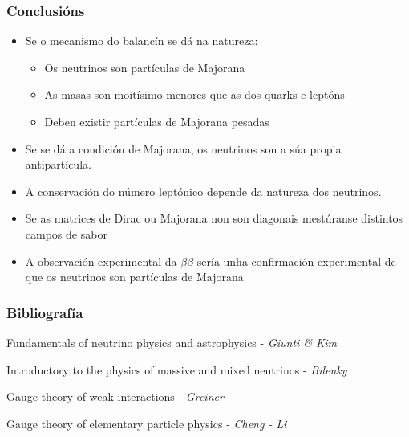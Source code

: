 \documentclass[10pt]{beamer}
\newcommand{\bi}{\begin{itemize}}
\newcommand{\ei}{\end{itemize}}
\begin{document}
\begin{frame} \frametitle{Conclusións}
\bi

\item Se o mecanismo do balancín se dá na natureza:

\bi

\item Os neutrinos son partículas de Majorana

\item As masas son moitísimo menores que as dos quarks e leptóns

\item Deben existir partículas de Majorana pesadas

\ei

\item Se se dá a condición de Majorana, os neutrinos son a súa propia antipartícula.

\item A conservación do número leptónico depende da natureza dos neutrinos.

\item Se as matrices de Dirac ou Majorana non son diagonais mestúranse distintos campos de sabor

\item A observación experimental da $\beta\beta$ sería unha confirmación experimental de que os neutrinos son partículas de Majorana

\ei
\end{frame}

\begin{frame} \frametitle{Bibliografía}

\begin{thebibliography}{4}
Fundamentals of neutrino physics and astrophysics - \textit{Giunti \& Kim}

Introductory to the physics of massive and mixed neutrinos  - \textit{Bilenky}

Gauge theory of weak interactions - \textit{Greiner}

Gauge theory of elementary particle physics - \textit{Cheng - Li}

\end{thebibliography}

\end{frame}
\end{document}
